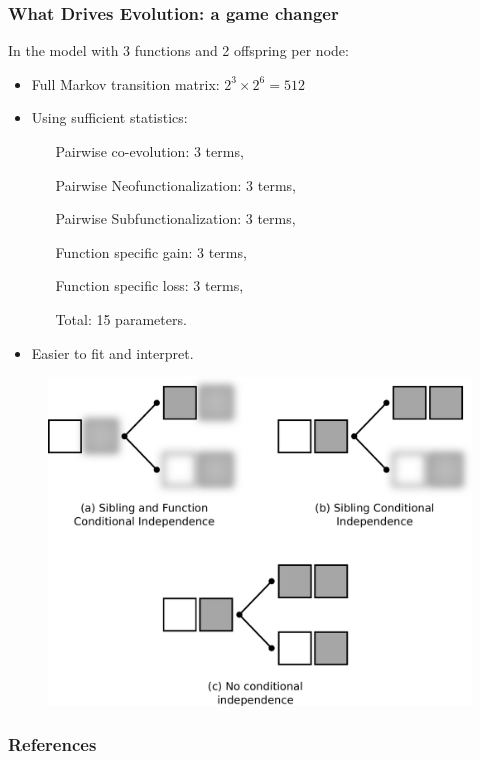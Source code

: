 \documentclass[aspectratio=169,9pt,handout]{beamer}
\begin{document}
\begin{frame}[c]
	\frametitle{What Drives Evolution: a game changer}
	
	\begin{minipage}[m]{.59\linewidth}
		In the model with 3 functions and 2 offspring per node:\pause
		\begin{itemize}
			\item Full Markov transition matrix: $2^3 \times 2^6 = 512$\pause
			\item Using sufficient statistics:\pause
			\begin{itemize}
				\item[] Pairwise co-evolution: 3 terms,\pause
				\item[]	Pairwise Neofunctionalization: 3 terms,\pause
				\item[] Pairwise Subfunctionalization: 3 terms,\pause
				\item[] Function specific gain: 3 terms,\pause
				\item[] Function specific loss: 3 terms,\pause
				\item[Total:] 15 parameters. \pause
			\end{itemize}
			\item Easier to fit and interpret.
		\end{itemize}
	\end{minipage}\hfill
	\begin{minipage}[m]{.39\linewidth}
		\begin{figure}
			\centering
			\includegraphics[width=.99\linewidth]{phylo-model-overview.pdf}
		\end{figure}
	\end{minipage}
	\vfill\hfill\hyperlink{aphylo-ergm-example}{}
\end{frame}

\begin{frame}[allowframebreaks]
	\frametitle{References}
	\printbibliography
\end{frame}
\end{document}
